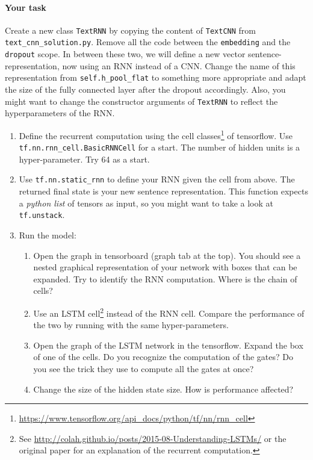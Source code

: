 \documentclass{article}
\begin{document}
\paragraph{Your task}
Create a new class \texttt{TextRNN} by copying the content of \texttt{TextCNN} from \texttt{text\_cnn\_solution.py}. Remove all the code between the \texttt{embedding} and the \texttt{dropout} scope. In between these two, we will define a new vector sentence-representation, now using an RNN instead of a CNN. Change the name of this representation from \texttt{self.h\_pool\_flat} to something more appropriate and adapt the size of the fully connected layer after the dropout accordingly. Also, you might want to change the constructor arguments of \texttt{TextRNN} to reflect the hyperparameters of the RNN.

\begin{enumerate}
	\item Define the recurrent computation using the cell classes\footnote{\url{https://www.tensorflow.org/api\_docs/python/tf/nn/rnn\_cell}} of tensorflow. Use \texttt{ tf.nn.rnn\_cell.BasicRNNCell} for a start. The number of hidden units is a hyper-parameter. Try 64 as a start.
	
	\item Use \texttt{tf.nn.static\_rnn} to define your RNN given the cell from above. The returned final state is your new sentence representation. This function expects a \emph{python list} of tensors as input, so you might want to take a look at \texttt{tf.unstack}.
	\item Run the model: 
	\begin{enumerate}
	\item Open the graph in tensorboard (graph tab at the top). You should see a nested graphical representation of your network with boxes that can be expanded. Try to identify the RNN computation. Where is the chain of cells? 
	\item Use an LSTM cell\footnote{See \url{http://colah.github.io/posts/2015-08-Understanding-LSTMs/} or the original paper\cite{hochreiter1997} for an explanation of the recurrent computation.} instead of the RNN cell. Compare the performance of the two by running with the same hyper-parameters.
	\item Open the graph of the LSTM network in the tensorflow. Expand the box of one of the cells. Do you recognize the computation of the gates? Do you see the trick they use to compute all the gates at once?
	\item Change the size of the hidden state size. How is performance affected?
	\end{enumerate}
\end{enumerate}




\end{document}
